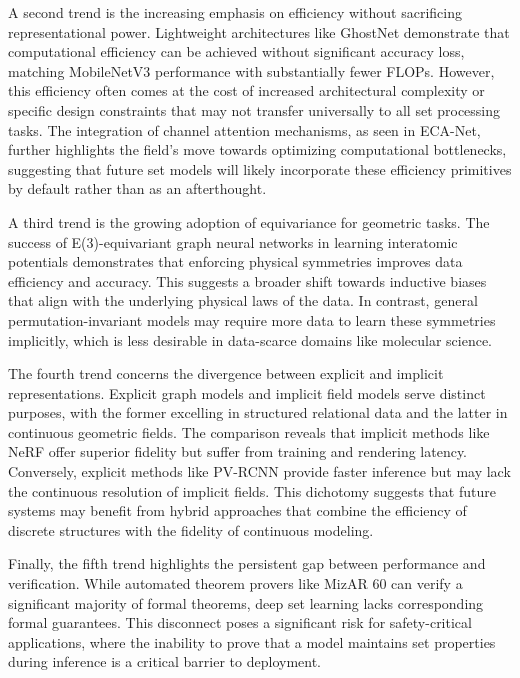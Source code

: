 \documentclass{article}
\begin{document}
A second trend is the increasing emphasis on efficiency without sacrificing representational power. Lightweight architectures like GhostNet demonstrate that computational efficiency can be achieved without significant accuracy loss, matching MobileNetV3 performance with substantially fewer FLOPs. However, this efficiency often comes at the cost of increased architectural complexity or specific design constraints that may not transfer universally to all set processing tasks. The integration of channel attention mechanisms, as seen in ECA-Net, further highlights the field's move towards optimizing computational bottlenecks, suggesting that future set models will likely incorporate these efficiency primitives by default rather than as an afterthought.

A third trend is the growing adoption of equivariance for geometric tasks. The success of E(3)-equivariant graph neural networks in learning interatomic potentials demonstrates that enforcing physical symmetries improves data efficiency and accuracy. This suggests a broader shift towards inductive biases that align with the underlying physical laws of the data. In contrast, general permutation-invariant models may require more data to learn these symmetries implicitly, which is less desirable in data-scarce domains like molecular science.

The fourth trend concerns the divergence between explicit and implicit representations. Explicit graph models and implicit field models serve distinct purposes, with the former excelling in structured relational data and the latter in continuous geometric fields. The comparison reveals that implicit methods like NeRF offer superior fidelity but suffer from training and rendering latency. Conversely, explicit methods like PV-RCNN provide faster inference but may lack the continuous resolution of implicit fields. This dichotomy suggests that future systems may benefit from hybrid approaches that combine the efficiency of discrete structures with the fidelity of continuous modeling.

Finally, the fifth trend highlights the persistent gap between performance and verification. While automated theorem provers like MizAR 60 can verify a significant majority of formal theorems, deep set learning lacks corresponding formal guarantees. This disconnect poses a significant risk for safety-critical applications, where the inability to prove that a model maintains set properties during inference is a critical barrier to deployment.
\end{document}
